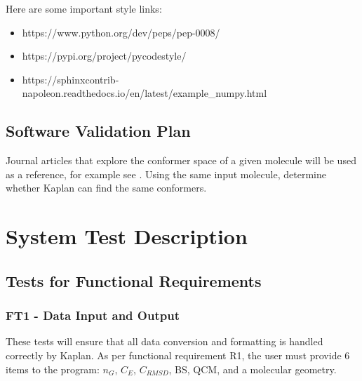 \documentclass[12pt, titlepage]{article}
\newcommand{\progname}{Kaplan} %
\begin{document}
Here are some important style links:

\begin{itemize}
	
\item https://www.python.org/dev/peps/pep-0008/
\item https://pypi.org/project/pycodestyle/
\item 
https://sphinxcontrib-napoleon.readthedocs.io/en/latest/example\_numpy.html

\end{itemize}

\subsection{Software Validation Plan}

Journal articles that explore the conformer space of a given molecule will be 
used as a reference, for example see \cite{butane-conformers}. Using the same 
input molecule, determine whether 
\progname{} can find the same conformers.

\section{System Test Description} \label{section-tests}
	
\subsection{Tests for Functional Requirements}

\subsubsection{FT1 - Data Input and Output}

These tests will ensure that all data conversion and formatting is handled 
correctly by \progname{}. As per functional requirement R1, the user must 
provide 6 items to the program: $n_G$, $C_E$, $C_{RMSD}$, BS, QCM, and a 
molecular geometry. 
\end{document}
